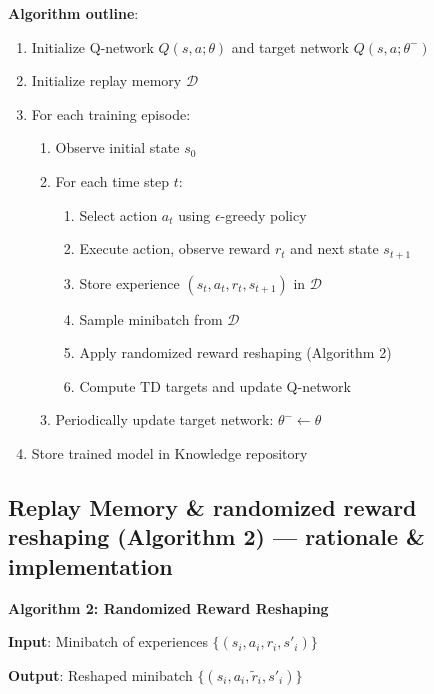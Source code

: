 \documentclass[11pt,a4paper]{article}
\begin{document}
\textbf{Algorithm outline}:
\begin{enumerate}
    \item Initialize Q-network $Q(s,a;\theta)$ and target network $Q(s,a;\theta^-)$
    \item Initialize replay memory $\mathcal{D}$
    \item For each training episode:
    \begin{enumerate}
        \item Observe initial state $s_0$
        \item For each time step $t$:
        \begin{enumerate}
            \item Select action $a_t$ using $\epsilon$-greedy policy
            \item Execute action, observe reward $r_t$ and next state $s_{t+1}$
            \item Store experience $(s_t, a_t, r_t, s_{t+1})$ in $\mathcal{D}$
            \item Sample minibatch from $\mathcal{D}$
            \item Apply randomized reward reshaping (Algorithm 2)
            \item Compute TD targets and update Q-network
        \end{enumerate}
        \item Periodically update target network: $\theta^- \leftarrow \theta$
    \end{enumerate}
    \item Store trained model in Knowledge repository
\end{enumerate}

\subsection{Replay Memory \& randomized reward reshaping (Algorithm 2) --- rationale \& implementation}

\textbf{Algorithm 2: Randomized Reward Reshaping}

\textbf{Input}: Minibatch of experiences $\{(s_i, a_i, r_i, s'_i)\}$

\textbf{Output}: Reshaped minibatch $\{(s_i, a_i, \tilde{r}_i, s'_i)\}$
\end{document}
